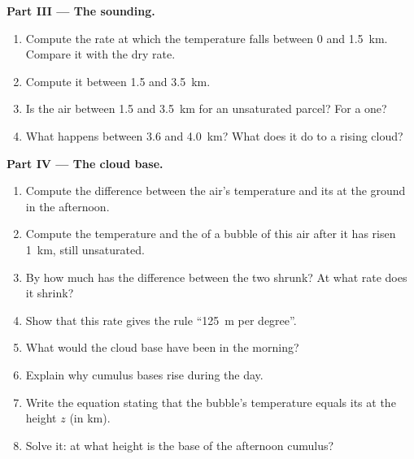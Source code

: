\begin{problem}
\medskip
\noindent\textbf{Part III --- The sounding.}
\begin{enumerate}[resume]
  \item Compute the rate at which the temperature falls between
        \num{0} and \qty{1.5}{km}. Compare it with the dry rate.
  \item Compute it between \num{1.5} and \qty{3.5}{km}.
  \item Is the air between \num{1.5} and \qty{3.5}{km}  for an
        unsaturated parcel? For a  one?
  \item What happens between \num{3.6} and \qty{4.0}{km}? What does it do
        to a rising cloud?
\end{enumerate}

\medskip
\noindent\textbf{Part IV --- The cloud base.}
\begin{enumerate}[resume]
  \item Compute the difference between the air's temperature and its  at the ground in the afternoon.
  \item Compute the temperature and the  of a bubble of this air
        after it has risen \qty{1}{km}, still unsaturated.
  \item By how much has the difference between the two shrunk? At what rate
        does it shrink?
  \item Show that this rate gives the rule ``\qty{125}{m} per degree''.
  \item What would the cloud base have been in the morning?
  \item Explain why cumulus bases rise during the day.
  \item Write the equation stating that the bubble's temperature equals its
         at the height $z$ (in km).
  \item Solve it: at what height is the base of the afternoon cumulus?
\end{enumerate}
\end{problem}
